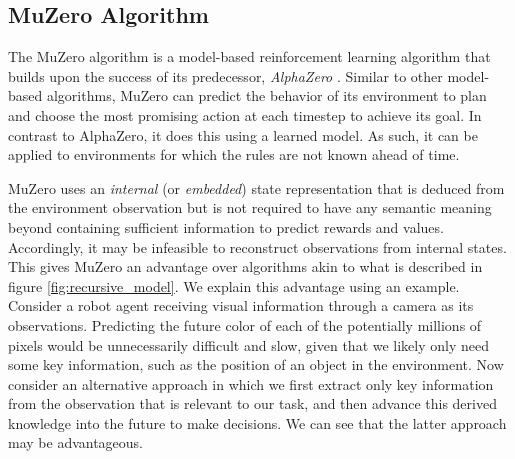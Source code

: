 \newcommand{\policy}{\text{\textbf{p}}}
\newcommand{\svalue}{\mathfrak{v}}

\subsection{MuZero Algorithm}
The MuZero algorithm \cite{muzero} is a model-based reinforcement learning algorithm that builds upon the success of its predecessor, \textit{AlphaZero} \cite{alphazero}. Similar to other model-based algorithms, MuZero can predict the behavior of its environment to plan and choose the most promising action at each timestep to achieve its goal. In contrast to AlphaZero, it does this using a learned model. As such, it can be applied to environments for which the rules are not known ahead of time.

MuZero uses an \textit{internal} (or \textit{embedded}) state representation that is deduced from the environment observation but is not required to have any semantic meaning beyond containing sufficient information to predict rewards and values. Accordingly, it may be infeasible to reconstruct observations from internal states. This gives MuZero an advantage over algorithms akin to what is described in figure \ref{fig:recursive_model}. We explain this advantage using an example. Consider a robot agent receiving visual information through a camera as its observations. Predicting the future color of each of the potentially millions of pixels would be unnecessarily difficult and slow, given that we likely only need some key information, such as the position of an object in the environment. Now consider an alternative approach in which we first extract only key information from the observation that is relevant to our task, and then advance this derived knowledge into the future to make decisions. We can see that the latter approach may be advantageous.

